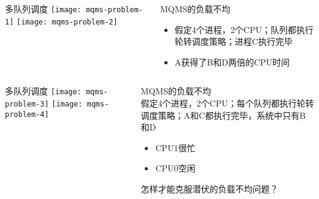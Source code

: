 \begin{frame}
	\begin{columns}
		\begin{column}{.5\textwidth}
			\Large \centering
			多队列调度
			\texttt{[image: mqms-problem-1]}
			\texttt{[image: mqms-problem-2]}	
		\end{column}
		
		\begin{column}{.5\textwidth}
			\large
			MQMS的负载不均\\ 
			\normalsize
			
			\begin{itemize}
				\item 假定4个进程，2个CPU；队列都执行轮转调度策略；进程C执行完毕
			\item  A获得了B和D两倍的CPU时间

			\end{itemize}
		\end{column}
	\end{columns}
\end{frame}



\begin{frame}
	\begin{columns}
		\begin{column}{.5\textwidth}
			\Large \centering
			多队列调度
			\texttt{[image: mqms-problem-3]}
			\texttt{[image: mqms-problem-4]}	
		\end{column}
		
		\begin{column}{.5\textwidth}
			\large
			MQMS的负载不均 \\
			\normalsize
			假定4个进程，2个CPU；每个队列都执行轮转调度策略；A和C都执行完毕，系统中只有B和D
			\begin{itemize}
				\item CPU1很忙
				\item CPU0空闲
				
			\end{itemize} \pause
		\Large
		怎样才能克服潜伏的负载不均问题？
		\end{column}
	\end{columns}
\end{frame}



